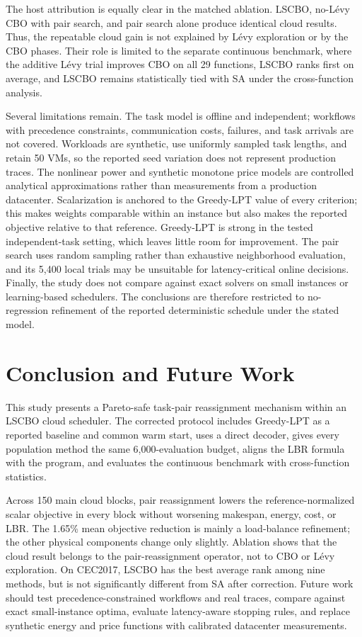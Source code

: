 \documentclass[pdflatex,onecolumn,sn-mathphys-num]{sn-jnl}
\begin{document}
The host attribution is equally clear in the matched ablation. LSCBO, no-L\'{e}vy CBO with pair search, and pair search alone produce identical cloud results. Thus, the repeatable cloud gain is not explained by L\'{e}vy exploration or by the CBO phases. Their role is limited to the separate continuous benchmark, where the additive L\'{e}vy trial improves CBO on all 29 functions, LSCBO ranks first on average, and LSCBO remains statistically tied with SA under the cross-function analysis.

Several limitations remain. The task model is offline and independent; workflows with precedence constraints, communication costs, failures, and task arrivals are not covered. Workloads are synthetic, use uniformly sampled task lengths, and retain 50 VMs, so the reported seed variation does not represent production traces. The nonlinear power and synthetic monotone price models are controlled analytical approximations rather than measurements from a production datacenter. Scalarization is anchored to the Greedy-LPT value of every criterion; this makes weights comparable within an instance but also makes the reported objective relative to that reference. Greedy-LPT is strong in the tested independent-task setting, which leaves little room for improvement. The pair search uses random sampling rather than exhaustive neighborhood evaluation, and its 5,400 local trials may be unsuitable for latency-critical online decisions. Finally, the study does not compare against exact solvers on small instances or learning-based schedulers. The conclusions are therefore restricted to no-regression refinement of the reported deterministic schedule under the stated model.

\section{Conclusion and Future Work}\label{sec7}

This study presents a Pareto-safe task-pair reassignment mechanism within an LSCBO cloud scheduler. The corrected protocol includes Greedy-LPT as a reported baseline and common warm start, uses a direct decoder, gives every population method the same 6,000-evaluation budget, aligns the LBR formula with the program, and evaluates the continuous benchmark with cross-function statistics.

Across 150 main cloud blocks, pair reassignment lowers the reference-normalized scalar objective in every block without worsening makespan, energy, cost, or LBR. The 1.65\% mean objective reduction is mainly a load-balance refinement; the other physical components change only slightly. Ablation shows that the cloud result belongs to the pair-reassignment operator, not to CBO or L\'{e}vy exploration. On CEC2017, LSCBO has the best average rank among nine methods, but is not significantly different from SA after correction. Future work should test precedence-constrained workflows and real traces, compare against exact small-instance optima, evaluate latency-aware stopping rules, and replace synthetic energy and price functions with calibrated datacenter measurements.
\end{document}
